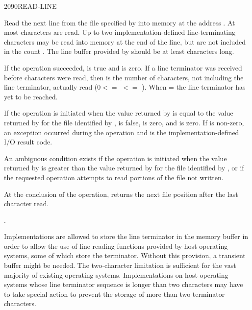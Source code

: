 \vspace*{-3ex}
\enlargethispage{8ex}
\begin{worddef}{2090}{READ-LINE}
\item {}

	Read the next line from the file specified by  into
	memory at the address . At most  characters
	are read. Up to two implementation-defined line-terminating
	characters may be read into memory at the end of the line, but
	are not included in the count . The line buffer provided
	by  should be at least  characters long.

	If the operation succeeded,  is true and 
	is zero. If a line terminator was received before 
	characters were read, then  is the number of characters,
	not including the line terminator, actually read ($0 <=$ 
	$<=$ ). When  =  the line
	terminator has yet to be reached.

	If the operation is initiated when the value returned by
	 is equal to the value returned by
	 for the file identified by ,
	 is false,  is zero, and  is zero.
	If  is non-zero, an exception occurred during the
	operation and  is the implementation-defined I/O
	result code.

	An ambiguous condition exists if the operation is initiated when
	the value returned by  is greater than the
	value returned by  for the file identified by
	, or if the requested operation attempts to read
	portions of the file not written.

	At the conclusion of the operation,  returns
	the next file position after the last character read.

\see {}.

	\begin{rationale} %
		Implementations are allowed to store the line terminator in
		the memory buffer in order to allow the use of line reading
		functions provided by host operating systems, some of which
		store the terminator. Without this provision, a transient
		buffer might be needed. The two-character limitation is
		sufficient for the vast majority of existing operating
		systems. Implementations on host operating systems whose line
		terminator sequence is longer than two characters may have to
		take special action to prevent the storage of more than two
		terminator characters.


\end{rationale}
\end{worddef}
